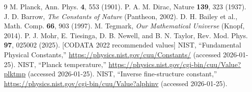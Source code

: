 \documentclass[twocolumn,showpacs,preprintnumbers,amsmath,amssymb,prl]{revtex4-2}
\begin{document}
\begin{thebibliography}{9}
 M. Planck, Ann. Phys. \textbf{4}, 553 (1901).
 P. A. M. Dirac, Nature \textbf{139}, 323 (1937).
 J. D. Barrow, \textit{The Constants of Nature} (Pantheon, 2002).
 D. H. Bailey et al., Math. Comp. \textbf{66}, 903 (1997).
 M. Tegmark, \textit{Our Mathematical Universe} (Knopf, 2014).
 P. J. Mohr, E. Tiesinga, D. B. Newell, and B. N. Taylor, Rev. Mod. Phys. \textbf{97}, 025002 (2025). [CODATA 2022 recommended values]
 NIST, ``Fundamental Physical Constants,'' \url{https://physics.nist.gov/cuu/Constants/} (accessed 2026-01-25).
 NIST, ``Planck temperature,'' \url{https://physics.nist.gov/cgi-bin/cuu/Value?plktmp} (accessed 2026-01-25).
 NIST, ``Inverse fine-structure constant,'' \url{https://physics.nist.gov/cgi-bin/cuu/Value?alphinv} (accessed 2026-01-25).
\end{thebibliography}
\end{document}
